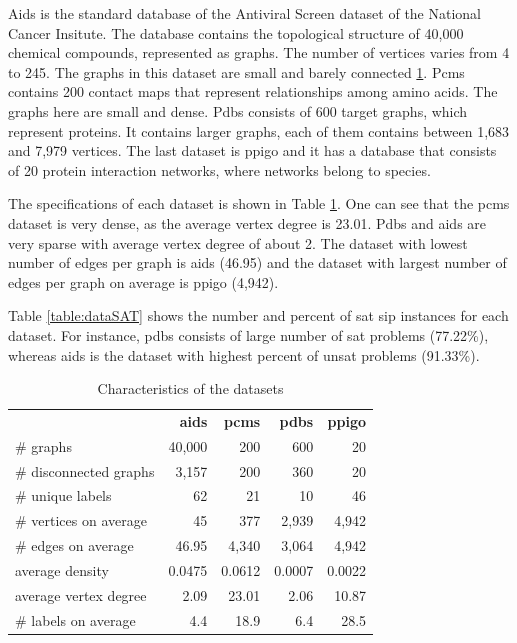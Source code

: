 \documentclass{l4proj}
\begin{document}
Aids is the standard database of the Antiviral Screen dataset of the National Cancer Insitute. The database contains the topological structure of 40,000 chemical compounds, represented as graphs. The number of vertices varies from 4 to 245. The graphs in this dataset are small and barely connected \ref{table:datasets}. Pcms contains 200 contact maps that represent relationships among amino acids. The graphs here are small and dense. Pdbs consists of 600 target graphs, which represent proteins. It contains larger graphs, each of them contains between 1,683 and 7,979 vertices. The last dataset is ppigo and it has a database that consists of 20 protein interaction networks, where networks belong to species.

The specifications of each dataset is shown in Table \ref{table:datasets}. One can see that the pcms dataset is very dense, as the average vertex degree is 23.01. Pdbs and aids are very sparse with average vertex degree of about 2. The dataset with lowest number of edges per graph is aids (46.95) and the dataset with largest number of edges per graph on average is ppigo (4,942).

Table \ref{table:dataSAT} shows the number and percent of \gls{sat} \gls{sip} instances for each dataset. For instance, pdbs consists of large number of \gls{sat} problems (77.22\%), whereas aids is the dataset with highest percent of \gls{unsat} problems (91.33\%).

\begin{table}
\centering
        \renewcommand{\arraystretch}{1.4}%
        \begin{tabular}{l|r|r|r|r|}
\cline{2-5}
& \textbf{aids} & \textbf{pcms} & \textbf{pdbs} & \textbf{ppigo} \\
\cline{1-5}
\multicolumn{1}{|l|}{\# graphs}  & 40,000 & 200	& 600   & 20 \\
\hline
\multicolumn{1}{|l|}{\# disconnected graphs} & 3,157 & 200 & 360 & 20 \\
\hline
\multicolumn{1}{|l|}{\# unique labels} & 62 & 21 & 10 & 46 \\
\hline
\multicolumn{1}{|l|}{\# vertices on average} & 45 & 377 & 2,939 & 4,942 \\
\hline
\multicolumn{1}{|l|}{\# edges on average} & 46.95 & 4,340 & 3,064 & 4,942 \\
\hline
\multicolumn{1}{|l|}{average density} & 0.0475 & 0.0612 & 0.0007 & 0.0022 \\
\hline
\multicolumn{1}{|l|}{average vertex degree} & 2.09 & 23.01 & 2.06 & 10.87 \\
\hline
\multicolumn{1}{|l|}{\# labels on average} & 4.4 & 18.9 & 6.4 & 28.5 \\
\hline
\end{tabular}
\caption{Characteristics of the datasets}
\label{table:datasets}
\end{table}
\end{document}

